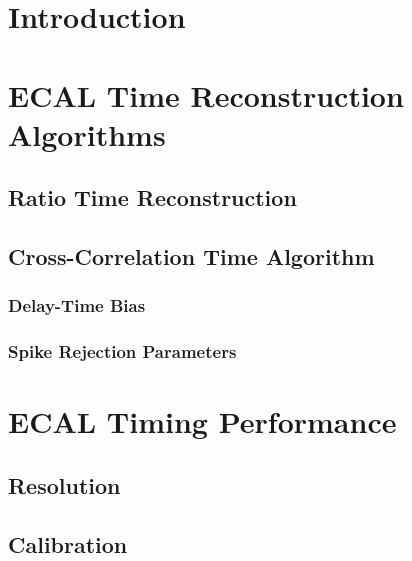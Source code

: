 \documentclass{cmspaper}
\begin{document}
\section{Introduction}
\label{sec:intro}

\FloatBarrier

\section{ECAL Time Reconstruction Algorithms}
\label{sec:algo}

\FloatBarrier

\subsection{Ratio Time Reconstruction}
\label{sec:algo1}

\FloatBarrier

\subsection{Cross-Correlation Time Algorithm}
\label{sec:algo2}

\FloatBarrier

\subsubsection{Delay-Time Bias}
\label{sec:recobias}

\FloatBarrier

\subsubsection{Spike Rejection Parameters}
\label{sec:resspkdata}

\FloatBarrier

\section{ECAL Timing Performance}
\label{sec:res}

\subsection{Resolution}
\label{sec:resmeth1}

\FloatBarrier

\subsection{Calibration}
\label{sec:resmeth3}

\FloatBarrier
\end{document}
